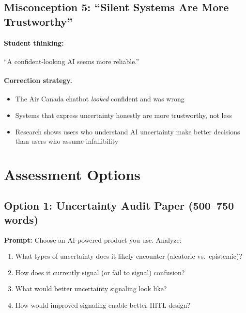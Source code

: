 \subsection{Misconception 5: ``Silent Systems Are More Trustworthy''}

\paragraph{Student thinking:} ``A confident-looking AI seems more reliable.''

\paragraph{Correction strategy.}
\begin{itemize}
    \item The Air Canada chatbot \emph{looked} confident and was wrong
    \item Systems that express uncertainty honestly are more trustworthy, not less
    \item Research shows users who understand AI uncertainty make better decisions than users who assume infallibility
\end{itemize}

\section{Assessment Options}

\subsection{Option 1: Uncertainty Audit Paper (500--750 words)}

\textbf{Prompt:} Choose an AI-powered product you use. Analyze:
\begin{enumerate}
    \item What types of uncertainty does it likely encounter (aleatoric vs.\ epistemic)?
    \item How does it currently signal (or fail to signal) confusion?
    \item What would better uncertainty signaling look like?
    \item How would improved signaling enable better HITL design?
\end{enumerate}

